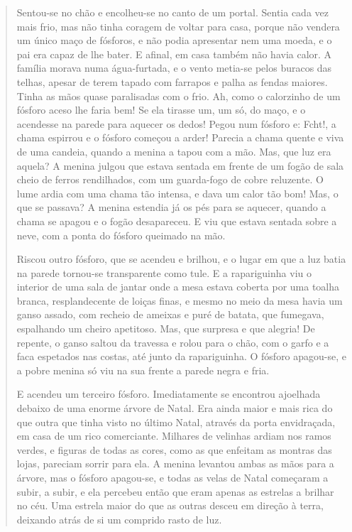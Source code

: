 \begin{quote}
Sentou-se no chão e encolheu-se no canto de um portal. Sentia cada vez
mais frio, mas não tinha coragem de voltar para casa, porque não vendera
um único maço de fósforos, e não podia apresentar nem uma moeda, e o pai
era capaz de lhe bater. E afinal, em casa também não havia calor. A
família morava numa água-furtada, e o vento metia-se pelos buracos das
telhas, apesar de terem tapado com farrapos e palha as fendas maiores.
Tinha as mãos quase paralisadas com o frio. Ah, como o calorzinho de um
fósforo aceso lhe faria bem! Se ela tirasse um, um só, do maço, e o
acendesse na parede para aquecer os dedos! Pegou num fósforo e: Fcht!, a
chama espirrou e o fósforo começou a arder! Parecia a chama quente e
viva de uma candeia, quando a menina a tapou com a mão. Mas, que luz era
aquela? A menina julgou que estava sentada em frente de um fogão de sala
cheio de ferros rendilhados, com um guarda-fogo de cobre reluzente. O
lume ardia com uma chama tão intensa, e dava um calor tão bom! Mas, o
que se passava? A menina estendia já os pés para se aquecer, quando a
chama se apagou e o fogão desapareceu. E viu que estava sentada sobre a
neve, com a ponta do fósforo queimado na mão.

Riscou outro fósforo, que se acendeu e brilhou, e o lugar em que a luz
batia na parede tornou-se transparente como tule. E a rapariguinha viu o
interior de uma sala de jantar onde a mesa estava coberta por uma toalha
branca, resplandecente de loiças finas, e mesmo no meio da mesa havia um
ganso assado, com recheio de ameixas e puré de batata, que fumegava,
espalhando um cheiro apetitoso. Mas, que surpresa e que alegria! De
repente, o ganso saltou da travessa e rolou para o chão, com o garfo e a
faca espetados nas costas, até junto da rapariguinha. O fósforo
apagou-se, e a pobre menina só viu na sua frente a parede negra e fria.

E acendeu um terceiro fósforo. Imediatamente se encontrou ajoelhada
debaixo de uma enorme árvore de Natal. Era ainda maior e mais rica do
que outra que tinha visto no último Natal, através da porta envidraçada,
em casa de um rico comerciante. Milhares de velinhas ardiam nos ramos
verdes, e figuras de todas as cores, como as que enfeitam as montras das
lojas, pareciam sorrir para ela. A menina levantou ambas as mãos para a
árvore, mas o fósforo apagou-se, e todas as velas de Natal começaram a
subir, a subir, e ela percebeu então que eram apenas as estrelas a
brilhar no céu. Uma estrela maior do que as outras desceu em direção à
terra, deixando atrás de si um comprido rasto de luz.


\end{quote}
